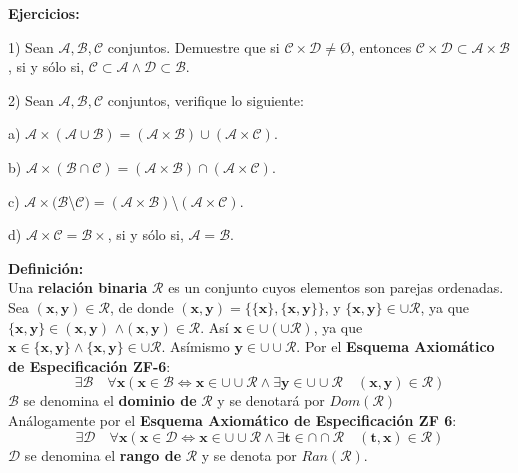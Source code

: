 \textbf{Ejercicios:}
	\begin{iteritem}
	
	\item 1) Sean $\mathcal{A,B,C}$ conjuntos. Demuestre que si $\mathcal{C}\times\mathcal{D}\neq$\O, entonces 
	      $\mathcal{C}\times\mathcal{D}\subset\mathcal{A}\times\mathcal{B}$, si y sólo si, 
	      $\mathcal{C}\subset\mathcal{A}\wedge\mathcal{D}\subset\mathcal{B}$.
	
        \item 2) Sean $\mathcal{A,B,C}$ conjuntos, verifique lo siguiente:
		\begin{iteritem}
		\item a) $\mathcal{A}\times(\mathcal{A}\cup\mathcal{B})=(\mathcal{A}\times\mathcal{B})\cup(\mathcal{A}\times\mathcal{C})$.
		\item b) $\mathcal{A}\times(\mathcal{B}\cap\mathcal{C})=(\mathcal{A}\times\mathcal{B})\cap(\mathcal{A}\times\mathcal{C})$.
		\item c) $\mathcal{A}\times(\mathcal{B}$\textbackslash$\mathcal{C})=(\mathcal{A}\times\mathcal{B})$\textbackslash$(\mathcal{A}\times\mathcal{C})$.
		\item d) $\mathcal{A}\times\mathcal{C}=\mathcal{B}\times$, si y sólo si, $\mathcal{A}=\mathcal{B}$.
		\end{iteritem}
	\end{iteritem}
\newpage

\textbf{Definición:}\\
Una \textbf{relación binaria} $\mathcal{R}$ es un conjunto cuyos elementos son parejas ordenadas.\\

Sea $(\mathbf{x,y})\in\mathcal{R}$, de donde $(\mathbf{x,y})=\{\{\mathbf{x}\},\{\mathbf{x,y}\}\}$, y $\{\mathbf{x,y}\}\in\cup\mathcal{R}$, ya que $\{\mathbf{x,y}\}\in(\mathbf{x,y})$ $\wedge(\mathbf{x,y})\in\mathcal{R}$. Así $\mathbf{x}\in\cup(\cup\mathcal{R})$, ya que $\mathbf{x}\in\{\mathbf{x,y}\}\wedge\{\mathbf{x,y}\}\in\cup\mathcal{R}$. Asímismo $\mathbf{y}\in\cup\cup\mathcal{R}$. Por el \textbf{Esquema Axiomático de Especificación ZF-6}:
\[\exists\mathcal{B}\quad\forall\mathbf{x}(\mathbf{x}\in\mathcal{B}\Longleftrightarrow\mathbf{x}\in\cup\cup\mathcal{R}\wedge\exists\mathbf{y}\in\cup\cup\mathcal{R}\quad(\mathbf{x,y})\in\mathcal{R})\]
$\mathcal{B}$ se denomina el \textbf{dominio de} $\mathcal{R}$ y se denotará por $Dom(\mathcal{R})$\\
Análogamente por el \textbf{Esquema Axiomático de Especificación ZF 6}: 
\[\exists\mathcal{D}\quad\forall\mathbf{x}(\mathbf{x}\in\mathcal{D}\Longleftrightarrow\mathbf{x}\in\cup\cup\mathcal{R}\wedge\exists\mathbf{t}\in\cap\cap\mathcal{R}\quad(\mathbf{t,x})\in\mathcal{R})\]
$\mathcal{D}$ se denomina el \textbf{rango de} $\mathcal{R}$ y se denota por $Ran(\mathcal{R})$.\\

